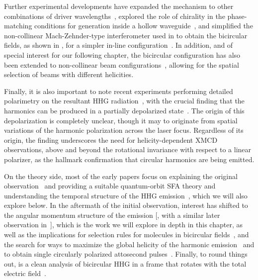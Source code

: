 Further experimental developments have expanded the mechanism to other combinations of driver wavelengths~\cite{fan_bright-circularly_2015}, explored the role of chirality in the phase-matching conditions for generation inside a hollow waveguide~\cite{kfir_chiral-phase-matching_2016}, and simplified the non-collinear Mach-Zehnder-type interferometer used in  to obtain the bicircular fields, as shown in , for a simpler in-line configuration~\cite{kfir_in-line-bicircular_2016}. In addition, and of special interest for our following chapter, the bicircular configuration has also been extended to non-collinear beam configurations~\cite{hickstein_non-collinear_2015}, allowing for the spatial selection of beams with different helicities. 


Finally, it is also important to note recent experiments performing detailed polarimetry on the resultant HHG radiation~\cite{veyrinhas_polarimetry-original_2013, veyrinhas_depolarized-hhg-atto_2015, chen_tomographic-hhg-polarimetry_2016}, with the crucial finding that the harmonics can be produced in a partially depolarized state~\cite{veyrinhas_depolarized-hhg-atto_2015}. The origin of this depolarization is completely unclear, though it may to originate from spatial variations of the harmonic polarization across the laser focus. Regardless of its origin, the finding underscores the need for helicity-dependent XMCD observations, above and beyond the rotational invariance with respect to a linear polarizer, as the hallmark confirmation that circular harmonics are being emitted.



On the theory side, most of the early papers focus on explaining the original observation~\cite{EichmannExperiment} and providing a suitable quantum-orbit SFA theory \cite{SFALong, SFAMilosevicBecker,milosevic_hhg-laser-phys_2001} and understanding the temporal structure of the HHG emission~\cite{milosevic_unusual-nonlinear-polarization_2000}, which we will also explore below. In the aftermath of the initial observation, interest has shifted to the angular momentum structure of the emission [\citealp{Ivanov_nature_photonics_2014, Pisanty_spin_conservation_2014}, with a similar later observation in~\citealp{milosevic_bicircular-angular-momentum_2015}], which is the work we will explore in depth in this chapter, as well as the implications for selection rules for molecules in bicircular fields~\cite{reich-madsen_molecular-symmetries_2016, baykusheva_bicircular-hhg-spectroscopy, liu_selection-rules-hhg_2016, mauger_bicircular-molecular-hhg, odzak_polyatomic-bicircular_2016, yuan-bandrauk_circular-hhg-extended-asymmetric-molecules_2011}, and the search for ways to maximize the global helicity of the harmonic emission~\cite{kfir_chiral-phase-matching_2016, milosevic_elliptical-apt_2015, milosevic_circularly_2015, medisauskas_generating_2016} and to obtain single circularly polarized attosecond pulses~\cite{ medisauskas_generating_2016, hernandez_isolated-circular-pulses_2016}. Finally, to round things out, is a clean analysis of bicircular HHG in a frame that rotates with the total electric field~\cite{reich-madsen_rotating-frame-bicircular_2016}.




